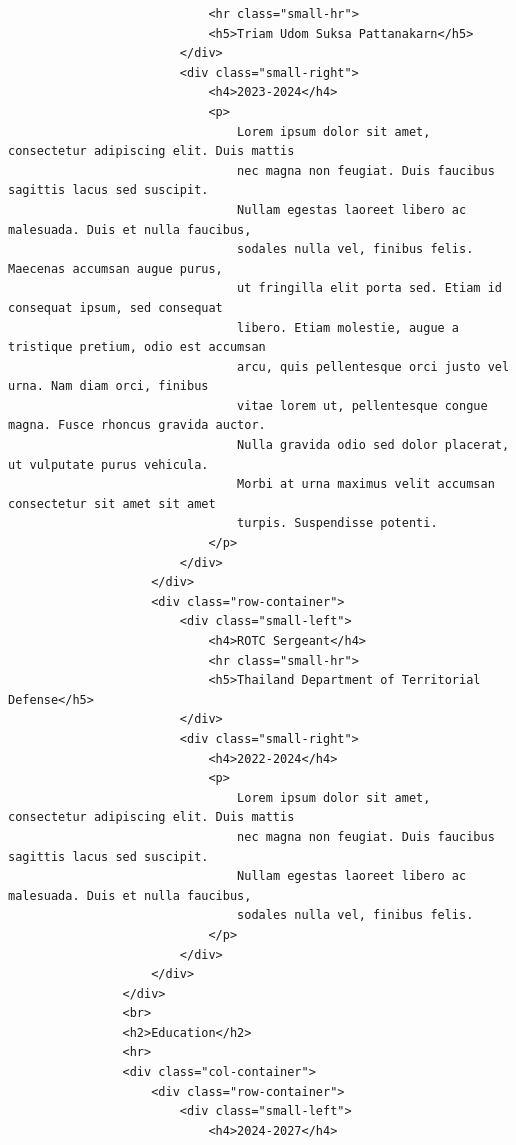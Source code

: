 \documentclass[12pt]{report} %
\begin{document}
\begin{verbatim}
                            <hr class="small-hr">
                            <h5>Triam Udom Suksa Pattanakarn</h5>
                        </div>
                        <div class="small-right">
                            <h4>2023-2024</h4>
                            <p>
                                Lorem ipsum dolor sit amet, consectetur adipiscing elit. Duis mattis 
                                nec magna non feugiat. Duis faucibus sagittis lacus sed suscipit. 
                                Nullam egestas laoreet libero ac malesuada. Duis et nulla faucibus, 
                                sodales nulla vel, finibus felis. Maecenas accumsan augue purus, 
                                ut fringilla elit porta sed. Etiam id consequat ipsum, sed consequat 
                                libero. Etiam molestie, augue a tristique pretium, odio est accumsan 
                                arcu, quis pellentesque orci justo vel urna. Nam diam orci, finibus 
                                vitae lorem ut, pellentesque congue magna. Fusce rhoncus gravida auctor. 
                                Nulla gravida odio sed dolor placerat, ut vulputate purus vehicula. 
                                Morbi at urna maximus velit accumsan consectetur sit amet sit amet 
                                turpis. Suspendisse potenti.
                            </p>
                        </div>
                    </div>
                    <div class="row-container">
                        <div class="small-left">
                            <h4>ROTC Sergeant</h4>
                            <hr class="small-hr">
                            <h5>Thailand Department of Territorial Defense</h5>
                        </div>
                        <div class="small-right">
                            <h4>2022-2024</h4>
                            <p>
                                Lorem ipsum dolor sit amet, consectetur adipiscing elit. Duis mattis 
                                nec magna non feugiat. Duis faucibus sagittis lacus sed suscipit. 
                                Nullam egestas laoreet libero ac malesuada. Duis et nulla faucibus, 
                                sodales nulla vel, finibus felis.
                            </p>
                        </div>
                    </div>
                </div>
                <br>
                <h2>Education</h2>
                <hr>
                <div class="col-container">
                    <div class="row-container">
                        <div class="small-left">
                            <h4>2024-2027</h4>

\end{verbatim}
\end{document}
